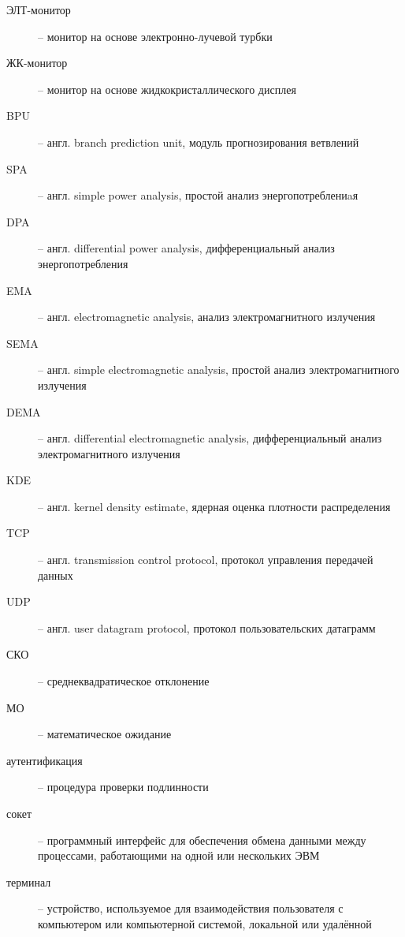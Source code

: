 
\begin{description}
\item[ЭЛТ-монитор] -- монитор на основе электронно-лучевой турбки
\item[ЖК-монитор] -- монитор на основе жидкокристаллического дисплея
\item[BPU] -- англ. branch prediction unit, модуль прогнозирования ветвлений
\item[SPA] -- англ. simple power analysis, простой анализ энергопотреблениaя
\item[DPA] -- англ. differential power analysis, дифференциальный анализ
  энергопотребления
\item[EMA] -- англ. electromagnetic analysis, анализ электромагнитного
  излучения
\item[SEMA] -- англ. simple electromagnetic analysis, простой анализ
  электромагнитного излучения
\item[DEMA] -- англ. differential electromagnetic analysis, дифференциальный
  анализ электромагнитного излучения
\item[KDE] -- англ. kernel density estimate, ядерная оценка плотности распределения
\item[TCP] -- англ. transmission control protocol, протокол управления передачей данных
\item[UDP] -- англ. user datagram protocol, протокол пользовательских датаграмм
\item[СКО] -- среднеквадратическое отклонение
\item[МО] -- математическое ожидание
\end{description}

\clearpage


\begin{description}
\item[аутентификация] -- процедура проверки подлинности
\item[сокет] -- программный интерфейс для обеспечения обмена данными между процессами, работающими на одной или нескольких ЭВМ
\item[терминал] -- устройство, используемое для взаимодействия пользователя с компьютером или компьютерной системой, локальной или удалённой
\end{description}

\clearpage
